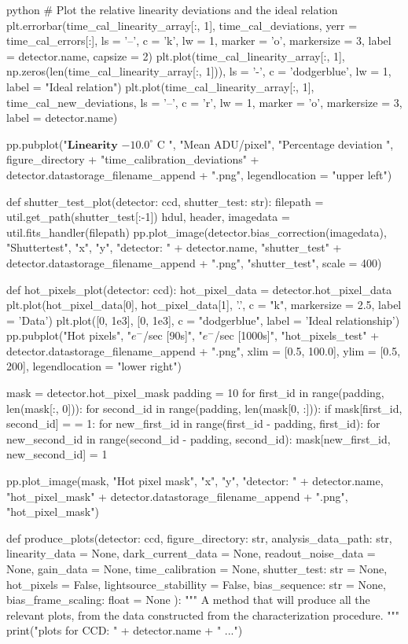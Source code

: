 \documentclass[../main.tex]{subfiles}
\begin{document}
\begin{mintedbox}{python}
# Plot the relative linearity deviations and the ideal relation
plt.errorbar(time_cal_linearity_array[:, 1], time_cal_deviations, yerr  =  time_cal_errors[:], ls  =  '--', c  =  'k',
lw  =  1, marker  =  'o', markersize  =  3, label  =  detector.name, capsize  =  2)
plt.plot(time_cal_linearity_array[:, 1], np.zeros(len(time_cal_linearity_array[:, 1])), ls  =  '-', c  =  'dodgerblue',
lw  =  1, label  =  "Ideal relation")
plt.plot(time_cal_linearity_array[:, 1], time_cal_new_deviations, ls  =  '--', c  =  'r', lw  =  1, marker  =  'o',
markersize  =  3, label  =  detector.name)

pp.pubplot("$\mathbf{Linearity}$ $-10.0^\circ $ C ", "Mean ADU/pixel", "Percentage deviation ",
figure_directory + "time_calibration_deviations" + detector.datastorage_filename_append + ".png",
legendlocation  =  "upper left")


def shutter_test_plot(detector: ccd, shutter_test: str):
filepath  =  util.get_path(shutter_test[:-1])
hdul, header, imagedata  =  util.fits_handler(filepath)
pp.plot_image(detector.bias_correction(imagedata), "Shuttertest", "x", "y", "detector: " + detector.name,
"shutter_test" + detector.datastorage_filename_append + ".png", "shutter_test", scale  =  400)


def hot_pixels_plot(detector: ccd):
hot_pixel_data  =  detector.hot_pixel_data
plt.plot(hot_pixel_data[0], hot_pixel_data[1], '.', c  =  "k", markersize  =  2.5, label  =  'Data')
plt.plot([0, 1e3], [0, 1e3], c  =  "dodgerblue", label  =  'Ideal relationship')
pp.pubplot("Hot pixels", "$e^-$/sec [90s]", "$e^-$/sec [1000s]",
"hot_pixels_test" + detector.datastorage_filename_append + ".png", xlim  =  [0.5, 100.0],
ylim  =  [0.5, 200], legendlocation  =  "lower right")

mask  =  detector.hot_pixel_mask
padding  =  10
for first_id in range(padding, len(mask[:, 0])):
for second_id in range(padding, len(mask[0, :])):
if mask[first_id, second_id]  =  =  1:
for new_first_id in range(first_id - padding, first_id):
for new_second_id in range(second_id - padding, second_id):
mask[new_first_id, new_second_id]  =  1

pp.plot_image(mask, "Hot pixel mask", "x", "y", "detector: " + detector.name,
"hot_pixel_mask" + detector.datastorage_filename_append + ".png", "hot_pixel_mask")


def produce_plots(detector: ccd,
figure_directory: str,
analysis_data_path: str,
linearity_data  =  None,
dark_current_data  =  None,
readout_noise_data  =  None,
gain_data  =  None,
time_calibration  =  None,
shutter_test: str  =  None,
hot_pixels  =  False,
lightsource_stabillity  =  False,
bias_sequence: str  =  None,
bias_frame_scaling: float  =  None
):
"""
A method that will produce all the relevant plots, from the data constructed
from the characterization procedure.
"""
print("\nProducing plots for CCD: " + detector.name + " ...")


\end{mintedbox}
\end{document}
